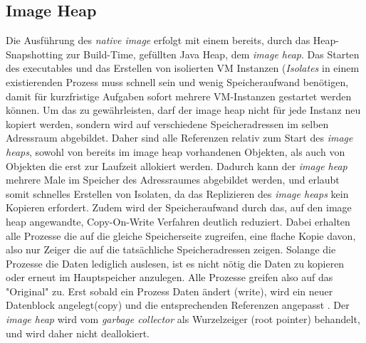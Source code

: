 \subsection{Image Heap}
\label{subsec:imageheap}

Die Ausführung des \textit{native image} erfolgt mit einem bereits, durch das Heap-Snapshotting zur Build-Time, gefüllten Java Heap,
dem \textit{image heap}. Das Starten des executables und das Erstellen von isolierten VM Instanzen (\textit{Isolates} in einem existierenden Prozess muss
schnell sein und wenig Speicheraufwand benötigen, damit für kurzfristige Aufgaben sofort mehrere VM-Instanzen gestartet werden können.
Um das zu gewährleisten, darf der image heap nicht für jede Instanz neu kopiert werden, sondern wird auf verschiedene Speicheradressen im selben Adressraum
abgebildet. Daher sind alle Referenzen relativ zum Start des \textit{image heaps}, sowohl von bereits im image heap vorhandenen Objekten, als auch von Objekten die 
erst zur Laufzeit allokiert werden. Dadurch kann der \textit{image heap} mehrere Male im Speicher des Adressraumes abgebildet werden, und erlaubt somit
schnelles Erstellen von Isolaten, da das Replizieren des \textit{image heaps} kein Kopieren erfordert. Zudem wird der Speicheraufwand durch das, auf den
image heap angewandte, Copy-On-Write Verfahren deutlich reduziert. Dabei erhalten alle Prozesse die auf die gleiche Speicherseite zugreifen, eine flache Kopie davon, also nur Zeiger die 
auf die tatsächliche Speicheradressen zeigen. Solange die Prozesse die Daten lediglich auslesen, ist es nicht nötig die Daten zu kopieren oder erneut im Hauptspeicher anzulegen. Alle Prozesse greifen also
auf das "Original" zu. Erst sobald ein Prozess Daten ändert (write), wird ein neuer Datenblock angelegt(copy) und die entsprechenden Referenzen angepasst \cite{bovet2002understanding}.
Der \textit{image heap} wird vom \textit{garbage collector} als Wurzelzeiger (root pointer) behandelt, und wird daher nicht deallokiert.